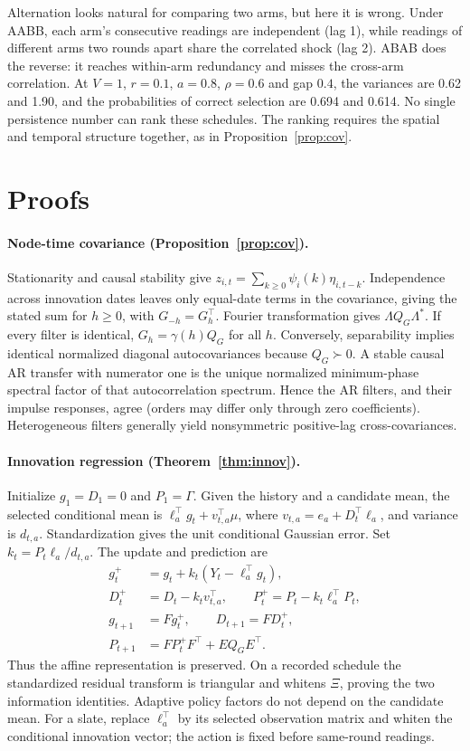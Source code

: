 \documentclass[sigconf,review,anonymous]{acmart}
\begin{document}
Alternation looks natural for comparing two arms, but here it is wrong. Under AABB, each arm's consecutive readings are independent (lag 1), while readings of different arms two rounds apart share the correlated shock (lag 2). ABAB does the reverse: it reaches within-arm redundancy and misses the cross-arm correlation. At $V=1$, $r=0.1$, $a=0.8$, $\rho=0.6$ and gap $0.4$, the variances are 0.62 and 1.90, and the probabilities of correct selection are 0.694 and 0.614. No single persistence number can rank these schedules. The ranking requires the spatial and temporal structure together, as in Proposition~\ref{prop:cov}.

\section{Proofs}\label{app:proofs}

\paragraph{Node-time covariance (Proposition~\ref{prop:cov}).}
Stationarity and causal stability give $z_{i,t}=\sum_{k\ge0}\psi_i(k)\eta_{i,t-k}$. Independence across innovation dates leaves only equal-date terms in the covariance, giving the stated sum for $h\ge0$, with $G_{-h}=G_h^\top$. Fourier transformation gives $\Lambda Q_G\Lambda^*$. If every filter is identical, $G_h=\gamma(h)Q_G$ for all $h$. Conversely, separability implies identical normalized diagonal autocovariances because $Q_G\succ0$. A stable causal AR transfer with numerator one is the unique normalized minimum-phase spectral factor of that autocorrelation spectrum. Hence the AR filters, and their impulse responses, agree (orders may differ only through zero coefficients). Heterogeneous filters generally yield nonsymmetric positive-lag cross-covariances.

\paragraph{Innovation regression (Theorem~\ref{thm:innov}).}
Initialize $g_1=D_1=0$ and $P_1=\Gamma$. Given the history and a candidate mean, the selected conditional mean is $\ell_a^\top g_t+v_{t,a}^\top\mu$, where $v_{t,a}=e_a+D_t^\top\ell_a$, and variance is $d_{t,a}$. Standardization gives the unit conditional Gaussian error. Set $k_t=P_t\ell_a/d_{t,a}$. The update and prediction are
\begin{align*}
g_t^+&=g_t+k_t(Y_t-\ell_a^\top g_t),\\
D_t^+&=D_t-k_tv_{t,a}^\top,\qquad P_t^+=P_t-k_t\ell_a^\top P_t,\\
g_{t+1}&=Fg_t^+,\qquad D_{t+1}=FD_t^+,\\
P_{t+1}&=FP_t^+F^\top+EQ_GE^\top.
\end{align*}
Thus the affine representation is preserved. On a recorded schedule the standardized residual transform is triangular and whitens $\Xi$, proving the two information identities. Adaptive policy factors do not depend on the candidate mean. For a slate, replace $\ell_a^\top$ by its selected observation matrix and whiten the conditional innovation vector; the action is fixed before same-round readings.
\end{document}
